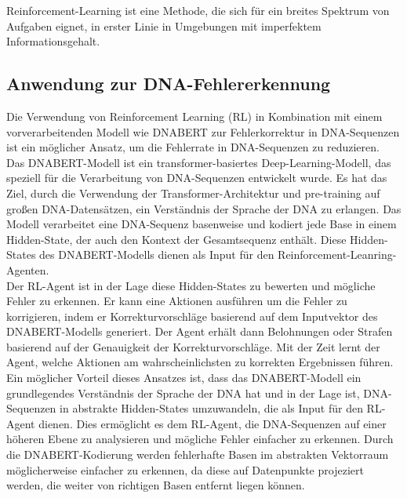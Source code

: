 \documentclass[oneside,bibliography=totocnumbered,BCOR=5mm]{scrbook}%
\theoremstyle{definition}
\theoremstyle{definition}
\theoremstyle{definition}
\theoremstyle{definition}
\theoremstyle{definition}
\theoremstyle{definition}
\begin{document}
Reinforcement-Learning ist eine Methode, die sich für ein breites Spektrum von
Aufgaben eignet, in erster Linie in Umgebungen mit imperfektem Informationsgehalt. 
\linebreak[4]


\subsection{Anwendung zur DNA-Fehlererkennung}
Die Verwendung von Reinforcement Learning (RL) in Kombination mit einem vorverarbeitenden Modell wie DNABERT 
zur Fehlerkorrektur in DNA-Sequenzen ist ein möglicher Ansatz, um die Fehlerrate in DNA-Sequenzen zu reduzieren. \\


Das DNABERT-Modell ist ein transformer-basiertes Deep-Learning-Modell, 
das speziell für die Verarbeitung von DNA-Sequenzen entwickelt wurde. 
Es hat das Ziel, durch die Verwendung der Transformer-Architektur und pre-training auf großen DNA-Datensätzen, 
ein Verständnis der Sprache der DNA zu erlangen. 
Das Modell verarbeitet eine DNA-Sequenz basenweise und kodiert jede Base in einem Hidden-State, 
der auch den Kontext der Gesamtsequenz enthält. 
Diese Hidden-States des DNABERT-Modells dienen als Input für den Reinforcement-Leanring-Agenten. \\


Der RL-Agent ist in der Lage diese Hidden-States zu bewerten und mögliche Fehler zu erkennen. 
Er kann eine Aktionen ausführen um die Fehler zu korrigieren, 
indem er Korrekturvorschläge basierend auf dem Inputvektor des DNABERT-Modells generiert. 
Der Agent erhält dann Belohnungen oder Strafen basierend auf der Genauigkeit der Korrekturvorschläge. 
Mit der Zeit lernt der Agent, welche Aktionen am wahrscheinlichsten zu korrekten Ergebnissen führen. \\


Ein möglicher Vorteil dieses Ansatzes ist, dass das DNABERT-Modell ein grundlegendes Verständnis der Sprache der DNA hat 
und in der Lage ist, DNA-Sequenzen in abstrakte Hidden-States umzuwandeln, die als Input für den RL-Agent dienen. 
Dies ermöglicht es dem RL-Agent, die DNA-Sequenzen auf einer höheren Ebene zu analysieren und mögliche Fehler 
einfacher zu erkennen. Durch die DNABERT-Kodierung werden fehlerhafte Basen im abstrakten Vektorraum
möglicherweise einfacher zu erkennen, da diese auf Datenpunkte projeziert werden, die weiter von
richtigen Basen entfernt liegen können. \\
 
\end{document}
